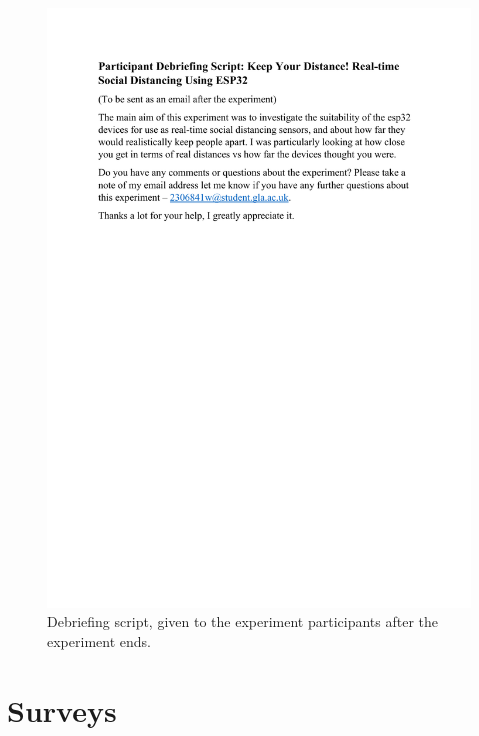 \documentclass{l4proj}
\begin{document}
\begin{appendices}
    \begin{figure}[!htb]
        \centering
        \includegraphics[width=1.0\linewidth]{images/Participant Debriefing Script.pdf}

        \caption{ Debriefing script, given to the experiment participants after the experiment ends. }

        \label{fig:participant_debriefing}
    \end{figure}

    \chapter{Surveys}


\end{appendices}
\end{document}
